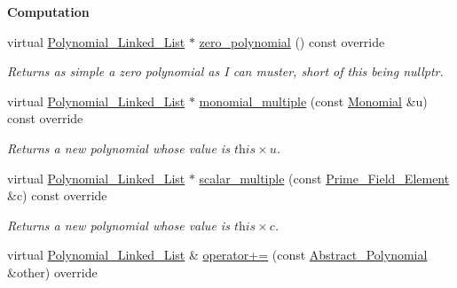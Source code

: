 \begin{Indent}\textbf{ Computation}\par
\begin{DoxyCompactItemize}
\item 
\mbox{\label{group__polygroup_afef3be2bfef96bffcc069c95147e1d03}} 
virtual \hyperlink{group__polygroup_class_polynomial___linked___list}{Polynomial\+\_\+\+Linked\+\_\+\+List} $\ast$ \hyperlink{group__polygroup_afef3be2bfef96bffcc069c95147e1d03}{zero\+\_\+polynomial} () const override
\begin{DoxyCompactList}\small\item\em Returns as simple a zero polynomial as I can muster, short of this being {\ttfamily nullptr}. \end{DoxyCompactList}\item 
\mbox{\label{group__polygroup_abb11e27691b50b0ef6edc87d5b041af5}} 
virtual \hyperlink{group__polygroup_class_polynomial___linked___list}{Polynomial\+\_\+\+Linked\+\_\+\+List} $\ast$ \hyperlink{group__polygroup_abb11e27691b50b0ef6edc87d5b041af5}{monomial\+\_\+multiple} (const \hyperlink{group__polygroup_class_monomial}{Monomial} \&u) const override
\begin{DoxyCompactList}\small\item\em Returns a new polynomial whose value is $\textit{this}\times u$. \end{DoxyCompactList}\item 
\mbox{\label{group__polygroup_af2df2928edc94ab86e9ded43a9f967f5}} 
virtual \hyperlink{group__polygroup_class_polynomial___linked___list}{Polynomial\+\_\+\+Linked\+\_\+\+List} $\ast$ \hyperlink{group__polygroup_af2df2928edc94ab86e9ded43a9f967f5}{scalar\+\_\+multiple} (const \hyperlink{group___fields_group_class_prime___field___element}{Prime\+\_\+\+Field\+\_\+\+Element} \&c) const override
\begin{DoxyCompactList}\small\item\em Returns a new polynomial whose value is $\textit{this}\times c$. \end{DoxyCompactList}\item 
\mbox{\label{group__polygroup_aafbd4195047ae999f1a5674d34797431}} 
virtual \hyperlink{group__polygroup_class_polynomial___linked___list}{Polynomial\+\_\+\+Linked\+\_\+\+List} \& \hyperlink{group__polygroup_aafbd4195047ae999f1a5674d34797431}{operator+=} (const \hyperlink{group__polygroup_class_abstract___polynomial}{Abstract\+\_\+\+Polynomial} \&other) override

\end{DoxyCompactItemize}
\end{Indent}
